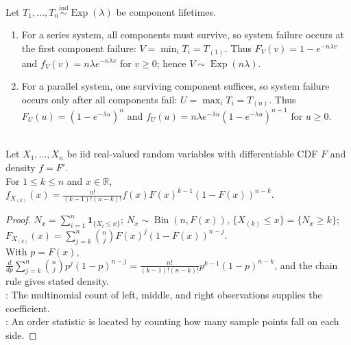 \begin{example} \label{ex:series-parallel-exponential-lifetimes} \\
Let $T_1,\ldots,T_n\overset{\mathrm{ind}}{\sim}\operatorname{Exp}(\lambda)$ be component lifetimes.
\begin{enumerate}[label=(\roman*)]
\setlength{\itemsep}{0pt}
\item
For a series system, all components must survive, so system failure occurs at the first component failure: $V=\min_i T_i=T_{(1)}$. Thus $F_V(v)=1-e^{-n\lambda v}$ and $f_V(v)=n\lambda e^{-n\lambda v}$ for $v\geq0$; hence $V\sim\operatorname{Exp}(n\lambda)$.
\item
For a parallel system, one surviving component suffices, so system failure occurs only after all components fail: $U=\max_i T_i=T_{(n)}$. Thus $F_U(u)=(1-e^{-\lambda u})^n$ and $f_U(u)=n\lambda e^{-\lambda u}(1-e^{-\lambda u})^{n-1}$ for $u\geq0$.
\end{enumerate}
\end{example}

\begin{theorem} \label{thm:kth-order-statistic-density} \\
Let $X_1,\ldots,X_n$ be iid real-valued random variables with differentiable CDF $F$ and density $f=F'$.\\
For $1\leq k\leq n$ and $x\in\mathbb{R}$, $f_{X_{(k)}}(x)=\frac{n!}{(k-1)!(n-k)!}f(x)F(x)^{k-1}(1-F(x))^{n-k}$.
\begin{proof} $N_x=\sum\limits_{i=1}^n\mathbf{1}_{\{X_i\leq x\}}$; $N_x\sim\operatorname{Bin}(n,F(x))$, $\{X_{(k)}\leq x\}=\{N_x\geq k\}$; $F_{X_{(k)}}(x)=\sum\limits_{j=k}^n\binom{n}{j}F(x)^j(1-F(x))^{n-j}$.\\
With $p=F(x)$, $\frac{d}{dp}\sum\limits_{j=k}^n\binom{n}{j}p^j(1-p)^{n-j}=\frac{n!}{(k-1)!(n-k)!}p^{k-1}(1-p)^{n-k}$, and the chain rule gives stated density.\\
: The multinomial count of left, middle, and right observations supplies the coefficient.\\
: An order statistic is located by counting how many sample points fall on each side.
\end{proof}
\end{theorem}

